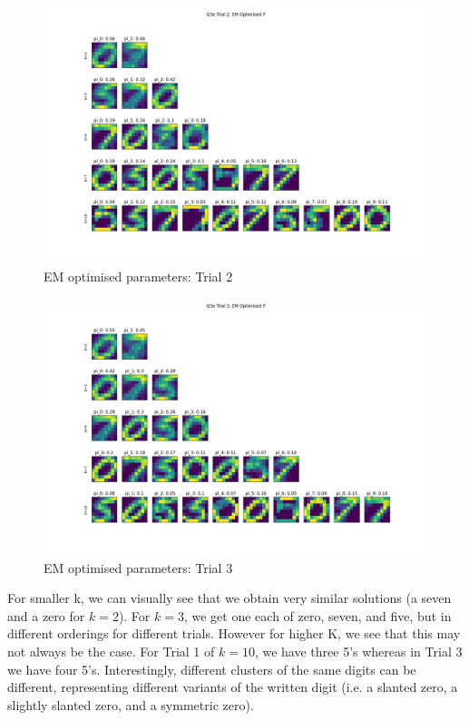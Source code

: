 \documentclass[12pt]{article}
\begin{document}
\begin{enumerate}
\begin{figure}[h]
  \centering
  \includegraphics[scale=0.3]{outputs/q3/q3e-2-optimised-p}
  \caption{EM optimised parameters: Trial 2}
  \label{fig:3e-initialised-p-trial-2}
\end{figure}
\begin{figure}[h]
  \centering
  \includegraphics[scale=0.3]{outputs/q3/q3e-3-optimised-p}
  \caption{EM optimised parameters: Trial 3}
  \label{fig:3e-initialised-p-trial-3}
\end{figure}


For smaller k, we can visually see that we obtain very similar solutions (a seven and a zero for $k=2$). For $k=3$, we get one each of zero, seven, and five, but in different orderings for different trials. However for higher K, we see that this may not always be the case. For Trial 1 of $k=10$, we have three 5's whereas in Trial 3 we have four 5's. Interestingly, different clusters of the same digits can be different, representing different variants of the written digit (i.e. a slanted zero, a slightly slanted zero, and a symmetric zero).


\end{enumerate}
\end{document}
